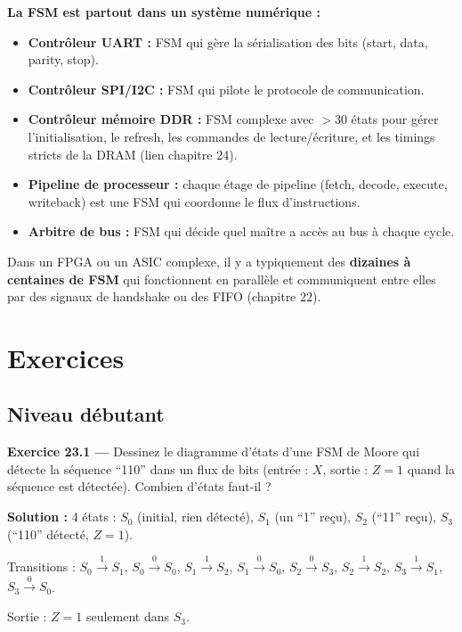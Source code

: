 \documentclass[12pt,a4paper,twoside]{book}
\begin{document}
\begin{intuition}
\textbf{La FSM est partout dans un système numérique :}
\begin{itemize}[nosep]
\item \textbf{Contrôleur UART :} FSM qui gère la sérialisation des bits (start, data, parity, stop).
\item \textbf{Contrôleur SPI/I2C :} FSM qui pilote le protocole de communication.
\item \textbf{Contrôleur mémoire DDR :} FSM complexe avec $>30$ états pour gérer l'initialisation, le refresh, les commandes de lecture/écriture, et les timings stricts de la DRAM (lien chapitre 24).
\item \textbf{Pipeline de processeur :} chaque étage de pipeline (fetch, decode, execute, writeback) est une FSM qui coordonne le flux d'instructions.
\item \textbf{Arbitre de bus :} FSM qui décide quel maître a accès au bus à chaque cycle.
\end{itemize}

Dans un FPGA ou un ASIC complexe, il y a typiquement des \textbf{dizaines à centaines de FSM} qui fonctionnent en parallèle et communiquent entre elles par des signaux de handshake ou des FIFO (chapitre 22).
\end{intuition}

\section*{Exercices}

\subsection*{Niveau débutant}

\textbf{Exercice 23.1 ---} Dessinez le diagramme d'états d'une FSM de Moore qui détecte la séquence ``110'' dans un flux de bits (entrée : $X$, sortie : $Z = 1$ quand la séquence est détectée). Combien d'états faut-il ?

\begin{pratique}
\textbf{Solution :} 4 états : $S_0$ (initial, rien détecté), $S_1$ (un ``1'' reçu), $S_2$ (``11'' reçu), $S_3$ (``110'' détecté, $Z = 1$).

Transitions : $S_0 \xrightarrow{1} S_1$, $S_0 \xrightarrow{0} S_0$, $S_1 \xrightarrow{1} S_2$, $S_1 \xrightarrow{0} S_0$, $S_2 \xrightarrow{0} S_3$, $S_2 \xrightarrow{1} S_2$, $S_3 \xrightarrow{1} S_1$, $S_3 \xrightarrow{0} S_0$.

Sortie : $Z = 1$ seulement dans $S_3$.
\end{pratique}
\end{document}
